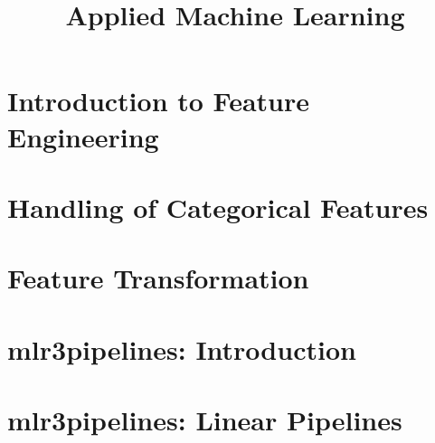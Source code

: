 \documentclass[11pt,compress,t,notes=noshow, aspectratio=169, xcolor=table]{beamer}
\title{Applied Machine Learning}
\date{}
\begin{document}
\newcommand{\titlefigure}{figure/empty}
\newcommand{\learninggoals}{
\item Categorical Encoding: \newline One-Hot and Target/Impact Encoding
\item Feature Transformations: \newline Normalization and Box-Cox Transformation
\item Intro to mlr3pipelines}



\section{Introduction to Feature Engineering}




\section{Handling of Categorical Features}


\section{Feature Transformation}
%

% 
% 
% 
\section{mlr3pipelines: Introduction}

%
%
\section{mlr3pipelines: Linear Pipelines}

\endlecture
\end{document}
